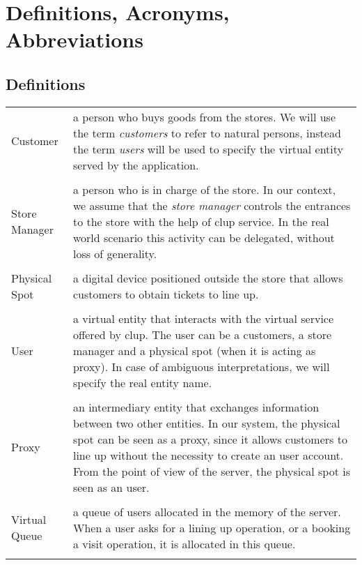 \section{Definitions, Acronyms, Abbreviations}

\subsection{Definitions}

\begin{tabularx}{\textwidth}{ >{\hsize=0.2\textwidth}X >{\hsize=0.8\textwidth}X}
    Customer      & a person who buys goods from the stores. We will use the term \textit{customers} to refer to natural persons, instead the term \textit{users} will be used to specify the virtual entity served by the application.                                               \\ \\
    Store Manager & a person who is in charge of the store. In our context, we assume that the \textit{store manager} controls the entrances to the store with the help of \gls{clup} service. In the real world scenario this activity can be delegated, without loss of generality.\\ \\
    Physical Spot & a digital device positioned outside the store that allows customers to obtain tickets to line up.\\ \\
    User & a virtual entity that interacts with the virtual service offered by \gls{clup}. The user can be a customers, a store manager and a physical spot (when it is acting as proxy). In case of ambiguous interpretations, we will specify the real entity name.\\ \\
    Proxy          & an intermediary entity that exchanges information between two other entities. In our system, the physical spot can be seen as a proxy, since it allows customers to line up without the necessity to create an user account. From the point of view of the server, the physical spot is seen as an user. \\ \\
    Virtual Queue & a queue of users allocated in the memory of the server. When a user asks for a lining up operation, or a booking a visit operation, it is allocated in this queue.\\ \\

\end{tabularx}
